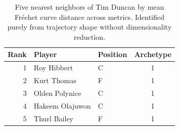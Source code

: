 \begin{table}[htbp]
  \centering\small
  \begin{tabular}{rllc}
    \toprule
    Rank & Player & Position & Archetype \\
    \midrule
    1 & Roy Hibbert & C & 1 \\
    2 & Kurt Thomas & F & 1 \\
    3 & Olden Polynice & C & 1 \\
    4 & Hakeem Olajuwon & C & 1 \\
    5 & Thurl Bailey & F & 1 \\
    \bottomrule
  \end{tabular}
  \caption{Five nearest neighbors of Tim Duncan by mean Fr\'{e}chet curve distance across metrics. Identified purely from trajectory shape without dimensionality reduction.}
  \label{tab:Tim_Duncan_frechet_curve_neighbors}
\end{table}

